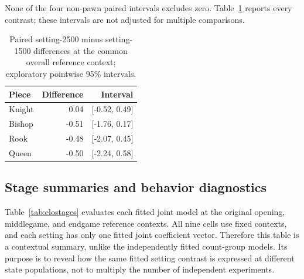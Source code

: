 None of the four non-pawn paired intervals excludes zero. Table~\ref{tab:elocontrast} reports every contrast; these intervals are not adjusted for multiple comparisons.
\begin{table}[htbp]\centering
\small
\caption{Paired setting-2500 minus setting-1500 differences at the common overall reference context; exploratory pointwise 95\% intervals.}\label{tab:elocontrast}
\begin{tabular}{lrr}
\toprule
Piece & Difference & Interval\\\midrule
Knight & 0.04 & [-0.52, 0.49]\\
Bishop & -0.51 & [-1.76, 0.17]\\
Rook & -0.48 & [-2.07, 0.45]\\
Queen & -0.50 & [-2.24, 0.58]\\
\bottomrule\end{tabular}\end{table}

\subsection{Stage summaries and behavior diagnostics}
Table~\ref{tab:elostages} evaluates each fitted joint model at the original opening, middlegame, and endgame reference contexts. All nine cells use fixed contexts, and each setting has only one fitted joint coefficient vector. Therefore this table is a contextual summary, unlike the independently fitted count-group models. Its purpose is to reveal how the same fitted setting contrast is expressed at different state populations, not to multiply the number of independent experiments.

